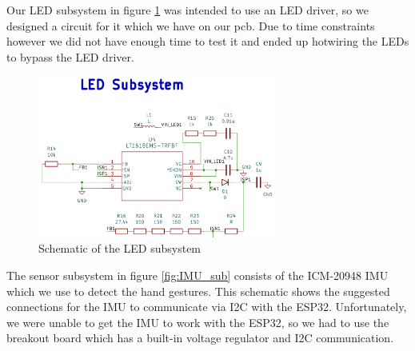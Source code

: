 Our LED subsystem in figure \ref{fig:LED_sub} was intended to use an LED driver, so we designed a circuit for it which we have on our pcb. Due to time constraints however we did not have enough time to test it and ended up hotwiring the LEDs to bypass the LED driver.
\begin{figure}[ht]
    \centering
    \includegraphics[width=0.7\textwidth]{images/LED_sub.png}
    \caption{Schematic of the LED subsystem}
    \label{fig:LED_sub}
\end{figure}
\newpage
The sensor subsystem in figure \ref{fig:IMU_sub} consists of the ICM-20948 IMU which we use to detect the hand gestures. This schematic shows the suggested connections \cite{invensense2016icm20948} for the IMU to communicate via I2C with the ESP32. Unfortunately, we were unable to get the IMU to work with the ESP32, so we had to use the breakout board which has a built-in voltage regulator and I2C communication.

